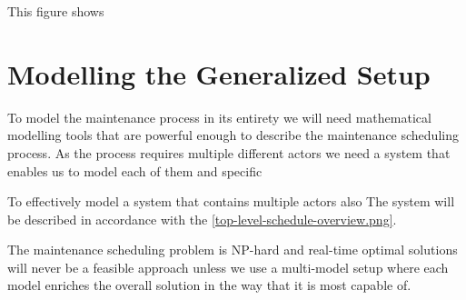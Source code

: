 This figure shows 



\chapter{Modelling the Generalized Setup}
To model the maintenance process in its entirety we will need mathematical modelling tools that are powerful enough to describe the maintenance
scheduling process. As the process requires multiple different actors we need a system that enables us to model each of them and specific   

To effectively model a system that contains multiple actors also 
The system will be described in accordance 
with the \ref{top-level-schedule-overview.png}\citep{palmer_maintenance_2019}.

The maintenance scheduling problem is NP-hard and real-time optimal solutions will never be a feasible approach unless we use a multi-model setup where each model enriches the 
overall solution in the way that it is most capable of. 


